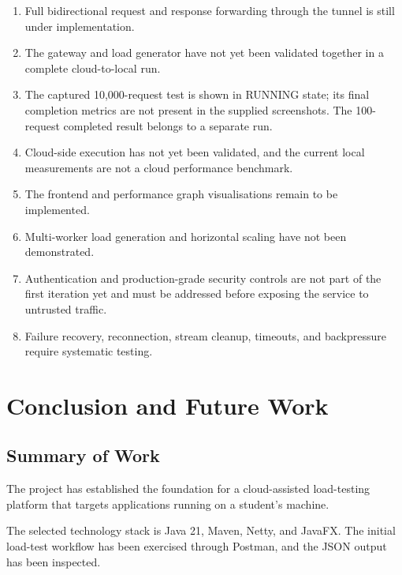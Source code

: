 \documentclass[11pt,a4paper,oneside]{report}
\begin{document}
\begin{enumerate}
  \item Full bidirectional request and response forwarding
  through the tunnel is still under implementation.

  \item The gateway and load generator have not yet been
  validated together in a complete cloud-to-local run.

  \item The captured 10,000-request test is shown in RUNNING
  state; its final completion metrics are not present in the supplied
  screenshots. The 100-request completed result belongs to a separate run.

  \item Cloud-side execution has not yet been validated, and the
  current local measurements are not a cloud performance benchmark.

  \item The frontend and performance graph visualisations remain
  to be implemented.

  \item Multi-worker load generation and horizontal scaling have
  not been demonstrated.

  \item Authentication and production-grade security controls
  are not part of the first iteration yet and must be addressed
  before exposing the service to untrusted traffic.

  \item Failure recovery, reconnection, stream cleanup,
  timeouts, and backpressure require systematic testing.
\end{enumerate}

\chapter{Conclusion and Future Work}

\section{Summary of Work}

The project has established the foundation for a cloud-assisted
load-testing platform that targets applications running on a
student's machine.

The selected technology stack is Java 21, Maven, Netty, and
JavaFX. The initial load-test workflow has been exercised
through Postman, and the JSON output has been inspected.
\end{document}
